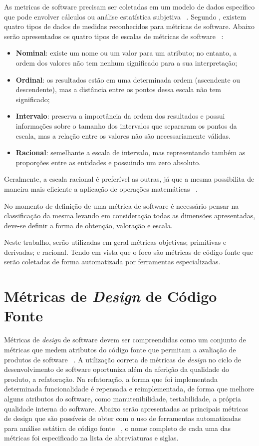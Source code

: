 As metricas de software precisam ser coletadas em um modelo de dados específico que pode envolver cálculos ou análise 
estatística subjetiva ~\cite{meirelles2013}. Segundo , existem quatro tipos de dados de medidas
reconhecidos para métricas de software. Abaixo serão apresentados os quatro tipos de escalas de métricas de software 
~\cite{meirelles2013}:

\begin{itemize}
  \item \textbf{Nominal}: existe um nome ou um valor para um atributo; no entanto, a ordem dos valores não tem nenhum 
    significado para a sua interpretação;
  \item \textbf{Ordinal}: os resultados estão em uma determinada ordem (ascendente ou descendente), mas a distância entre os 
    pontos dessa escala não tem significado;
  \item \textbf{Intervalo}: preserva a importância da ordem dos resultados e possui informações sobre o tamanho dos intervalos
    que separaram os pontos da escala, mas a relação entre os valores não são necessariamente válidas.
  \item \textbf{Racional}: semelhante a escala de intervalo, mas representando também as proporções entre as entidades e
    possuindo um zero absoluto. 
\end{itemize}

Geralmente, a escala racional é preferível as outras, já que a mesma possibilita de maneira mais eficiente a aplicação de 
operações matemáticas ~\cite{meirelles2013}.

No momento de definição de uma métrica de software é necessário pensar na classificação da mesma levando em consideração
todas as dimensões apresentadas, deve-se definir a forma de obtenção, valoração e escala.

Neste trabalho, serão utilizadas em geral métricas objetivas; primitivas e derivadas; e racional. Tendo em vista que o 
foco são métricas de código fonte que serão coletadas de forma automatizada por ferramentas especializadas.


\section{Métricas de \textit{Design} de Código Fonte}

Métricas de \textit{design} de software devem ser compreendidas como um conjunto de métricas que medem atributos do código 
fonte que permitam a avaliação de produtos de software ~\cite{arthur&carlos2014}. A utilização correta de métricas de \textit{design} no ciclo
de desenvolvimento de software oportuniza além da aferição da qualidade do produto, a refatoração. Na refatoração, a forma que
foi implementada determinada funcionalidade é repensada e reimplementada, de forma que melhore alguns atributos do software,
como manutenibilidade, testabilidade, a própria qualidade interna do software. Abaixo serão apresentadas as principais métricas
de design que são possíveis de obter com o uso de ferramentas automatizadas para análise estática de código fonte 
~\cite{arthur&carlos2014,meirelles2013}, o nome completo de cada uma das métricas foi especificado na lista de abreviaturas e 
siglas.

